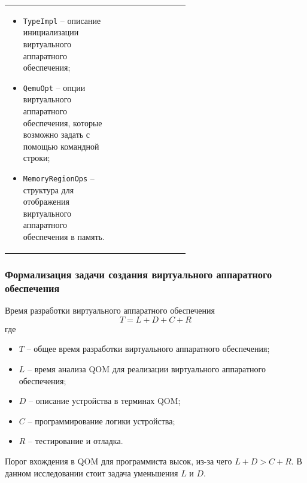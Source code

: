 \begin{frame}
{\begin{tabularx}{\linewidth}{ p{0.6\linewidth} X }
            \setlength{\leftmargini}{0pt}
            \setlength{\leftmarginii}{0pt}
            \begin{itemize}
                \item \texttt{TypeImpl} -- описание инициализации виртуального аппаратного обеспечения;
                \item \texttt{QemuOpt} -- опции виртуального аппаратного обеспечения, которые возможно
                    задать с помощью командной строки;
                \item \texttt{MemoryRegionOps} -- структура для отображения виртуального аппаратного обеспечения в память.
            \end{itemize}
        \end{tabularx}
    }
\end{frame}


\begin{frame}%
    \setlength{\abovedisplayskip}{0pt}
    \setlength{\belowdisplayskip}{0pt}
    \frametitle{Формализация задачи создания виртуального аппаратного обеспечения}
    Время разработки виртуального аппаратного обеспечения
    \begin{equation}
        T = L + D + C + R
    \end{equation}
    где
    \begin{itemize}
        \item $T$ -- общее время разработки виртуального аппаратного обеспечения;
        \item $L$ -- время анализа QOM для реализации виртуального аппаратного обеспечения;
        \item $D$ -- описание устройства в терминах QOM;
        \item $C$ -- программирование логики устройства;
        \item $R$ -- тестирование и отладка.
    \end{itemize}

    Порог вхождения в QOM для программиста высок, из-за чего
    $L + D > C + R$.
    В данном исследовании стоит задача уменьшения $L$ и $D$.
\end{frame}


